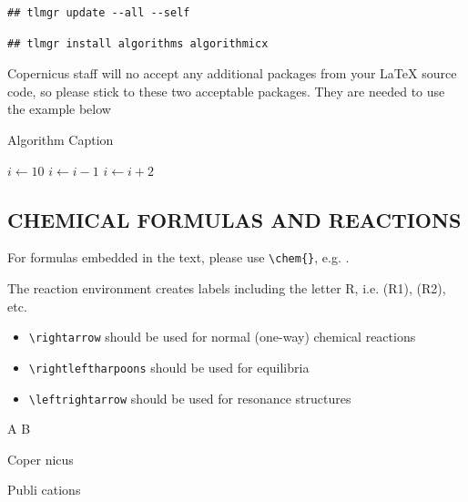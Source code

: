\documentclass[gc, manuscript]{copernicus}
\begin{document}
\begin{verbatim}
## tlmgr update --all --self
\end{verbatim}

\begin{verbatim}
## tlmgr install algorithms algorithmicx
\end{verbatim}

Copernicus staff will no accept any additional packages from your LaTeX
source code, so please stick to these two acceptable packages. They are
needed to use the example below

\begin{algorithm}
\caption{Algorithm Caption}
\label{a1}
\begin{algorithmic}
\STATE $i\gets 10$
        \STATE $i\gets i-1$
\ELSE
                \STATE $i\gets i+2$
        \ENDIF
\ENDIF
\end{algorithmic}
\end{algorithm}

\subsection{CHEMICAL FORMULAS AND REACTIONS}

For formulas embedded in the text, please use
\texttt{\textbackslash{}chem\{\}}, e.g. .

The reaction environment creates labels including the letter R, i.e.
(R1), (R2), etc.

\begin{itemize}
\item
  \texttt{\textbackslash{}rightarrow} should be used for normal
  (one-way) chemical reactions
\item
  \texttt{\textbackslash{}rightleftharpoons} should be used for
  equilibria
\item
  \texttt{\textbackslash{}leftrightarrow} should be used for resonance
  structures
\end{itemize}

\begin{reaction}
A \rightarrow B \\
\end{reaction}
\begin{reaction}
Coper \rightleftharpoons nicus \\
\end{reaction}
\begin{reaction}
Publi \leftrightarrow cations
\end{reaction}
\end{document}
